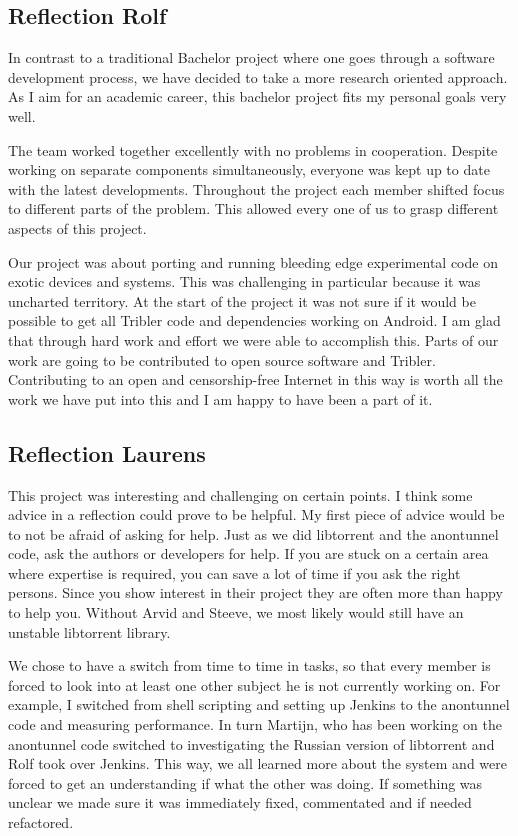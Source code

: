 		\subsection{Reflection Rolf}
		In contrast to a traditional Bachelor project where one goes through a software development process, we have decided to take a more research oriented approach. As I aim for an academic career, this bachelor project fits my personal goals very well.
		
		The team worked together excellently with no problems in cooperation. Despite working on separate components simultaneously, everyone was kept up to date with the latest developments. Throughout the project each member shifted focus to different parts of the problem. This allowed every one of us to grasp different aspects of this project.
		
		Our project was about porting and running bleeding edge experimental code on exotic devices and systems. This was challenging in particular because it was uncharted territory. At the start of the project it was not sure if it would be possible to get all Tribler code and dependencies working on Android. I am glad that through hard work and effort we were able to accomplish this. Parts of our work are going to be contributed to open source software and Tribler. Contributing to an open and censorship-free Internet in this way is worth all the work we have put into this and I am happy to have been a part of it.
		
		\subsection{Reflection Laurens}
			This project was interesting and challenging on certain points. I think some advice in a reflection could prove to be helpful. My first piece of advice would be to not be afraid of asking for help.
			Just as we did libtorrent and the anontunnel code, ask the authors or developers for help. If you are stuck on a certain area where expertise is required, you can save a lot of time if you ask the right persons.
			Since you show interest in their project they are often more than happy to help you. Without Arvid and Steeve, we most likely would still have an unstable libtorrent library.
			
			
			We chose to have a switch from time to time in tasks, so that every member is forced to look into at least one other subject he is not currently working on. For example, I switched from shell scripting and setting up Jenkins to the anontunnel code and measuring performance. In turn Martijn, who has been working on the anontunnel code switched to investigating the Russian version of libtorrent and Rolf took over Jenkins. This way, we all learned more about the system and were forced to get an understanding if what the other was doing. If something was unclear we made sure it was immediately fixed, commentated and if needed refactored.
			
